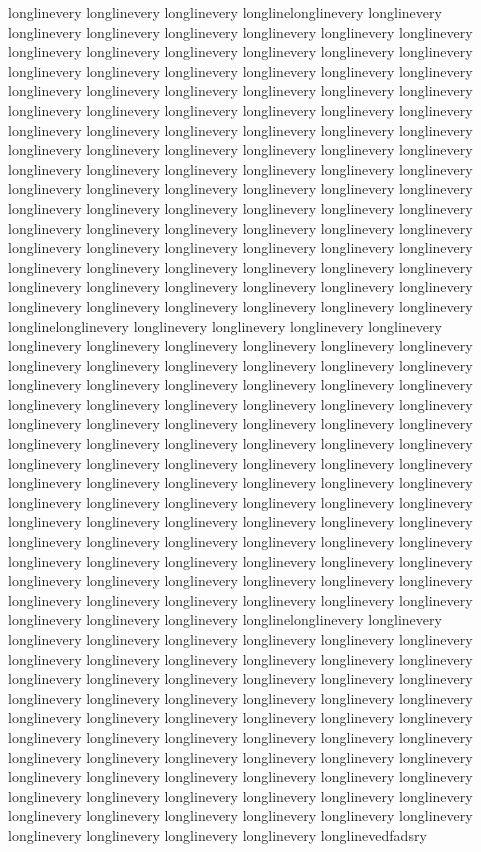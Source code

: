 {longlinevery longlinevery longlinevery longlinelonglinevery longlinevery longlinevery longlinevery longlinevery longlinevery longlinevery longlinevery longlinevery longlinevery longlinevery longlinevery longlinevery longlinevery longlinevery longlinevery longlinevery longlinevery longlinevery longlinevery longlinevery longlinevery longlinevery longlinevery longlinevery longlinevery longlinevery longlinevery longlinevery longlinevery longlinevery longlinevery longlinevery longlinevery longlinevery longlinevery longlinevery longlinevery longlinevery longlinevery longlinevery longlinevery longlinevery longlinevery longlinevery longlinevery longlinevery longlinevery longlinevery longlinevery longlinevery longlinevery longlinevery longlinevery longlinevery longlinevery longlinevery longlinevery longlinevery longlinevery longlinevery longlinevery longlinevery longlinevery longlinevery longlinevery longlinevery longlinevery longlinevery longlinevery longlinevery longlinevery longlinevery longlinevery longlinevery longlinevery longlinevery longlinevery longlinevery longlinevery longlinevery longlinevery longlinevery longlinevery longlinevery longlinevery longlinevery longlinevery longlinevery longlinevery longlinevery longlinevery longlinelonglinevery longlinevery longlinevery longlinevery longlinevery longlinevery longlinevery longlinevery longlinevery longlinevery longlinevery longlinevery longlinevery longlinevery longlinevery longlinevery longlinevery longlinevery longlinevery longlinevery longlinevery longlinevery longlinevery longlinevery longlinevery longlinevery longlinevery longlinevery longlinevery longlinevery longlinevery longlinevery longlinevery longlinevery longlinevery longlinevery longlinevery longlinevery longlinevery longlinevery longlinevery longlinevery longlinevery longlinevery longlinevery longlinevery longlinevery longlinevery longlinevery longlinevery longlinevery longlinevery longlinevery longlinevery longlinevery longlinevery longlinevery longlinevery longlinevery longlinevery longlinevery longlinevery longlinevery longlinevery longlinevery longlinevery longlinevery longlinevery longlinevery longlinevery longlinevery longlinevery longlinevery longlinevery longlinevery longlinevery longlinevery longlinevery longlinevery longlinevery longlinevery longlinevery longlinevery longlinevery longlinevery longlinevery longlinevery longlinevery longlinevery longlinevery longlinevery longlinevery longlinelonglinevery longlinevery longlinevery longlinevery longlinevery longlinevery longlinevery longlinevery longlinevery longlinevery longlinevery longlinevery longlinevery longlinevery longlinevery longlinevery longlinevery longlinevery longlinevery longlinevery longlinevery longlinevery longlinevery longlinevery longlinevery longlinevery longlinevery longlinevery longlinevery longlinevery longlinevery longlinevery longlinevery longlinevery longlinevery longlinevery longlinevery longlinevery longlinevery longlinevery longlinevery longlinevery longlinevery longlinevery longlinevery longlinevery longlinevery longlinevery longlinevery longlinevery longlinevery longlinevery longlinevery longlinevery longlinevery longlinevery longlinevery longlinevery longlinevery longlinevery longlinevery longlinevery longlinevery longlinevery longlinevery longlinevery longlinevedfadsry }
